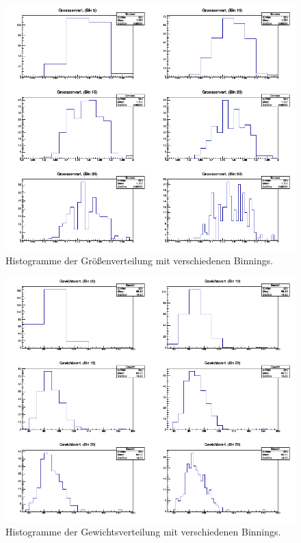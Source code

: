 \begin{itemize}
\begin{figure}
\centering
\includegraphics[width=\textwidth]{GroessenverteilungBinnings2x3.png}
\caption{Histogramme der Größenverteilung mit verschiedenen Binnings.}
\end{figure}

\begin{figure}
\centering
\includegraphics[width=\textwidth]{GewichtsverteilungBinnings2x3.png}
\caption{Histogramme der Gewichtsverteilung mit verschiedenen Binnings.}
\end{figure}


\end{itemize}
